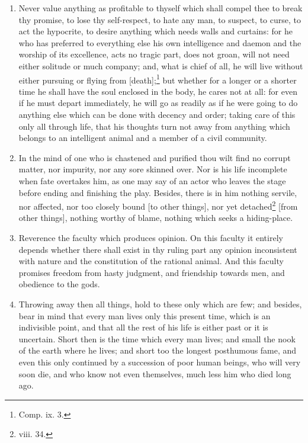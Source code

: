 \begin{enumerate}
\item Never value anything as profitable to thyself which shall compel thee to break thy promise, to lose thy self-respect, to hate any man, to suspect, to curse, to act the hypocrite, to desire anything which needs walls and curtains: for he who has preferred to everything else his own intelligence and daemon and the worship of its excellence, acts no tragic part, does not groan, will not need either solitude or much company; and, what is chief of all, he will live without either pursuing or flying from [{\clarify death}];\footnote{Comp. ix. 3.} but whether for a longer or a shorter time he shall have the soul enclosed in the body, he cares not at all: for even if he must depart immediately, he will go as readily as if he were going to do anything else which can be done with decency and order; taking care of this only all through life, that his thoughts turn not away from anything which belongs to an intelligent animal and a member of a civil community.

\item In the mind of one who is chastened and purified thou wilt find no corrupt matter, nor impurity, nor any sore skinned over. Nor is his life incomplete when fate overtakes him, as one may say of an actor who leaves the stage before ending and finishing the play. Besides, there is in him nothing servile, nor affected, nor too closely bound [{\clarify to other things}], nor yet detached\footnote{viii. 34.} [{\clarify from other things}], nothing worthy of blame, nothing which seeks a hiding-place.

\item Reverence the faculty which produces opinion. On this faculty it entirely depends whether there shall exist in thy ruling part any opinion inconsistent with nature and the constitution of the rational animal. And this faculty promises freedom from hasty judgment, and friendship towards men, and obedience to the gods.

\item Throwing away then all things, hold to these only which are few; and besides, bear in mind that every man lives only this present time, which is an indivisible point, and that all the rest of his life is either past or it is uncertain. Short then is the time which every man lives; and small the nook of the earth where he lives; and short too the longest posthumous fame, and even this only continued by a succession of poor human beings, who will very soon die, and who know not even themselves, much less him who died long ago.


\end{enumerate}
